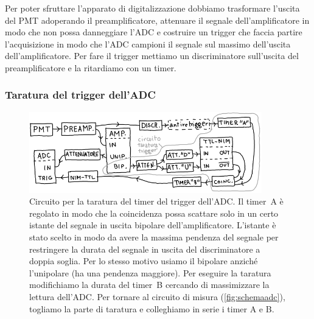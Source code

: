 Per poter sfruttare l'apparato di digitalizzazione dobbiamo trasformare l'uscita del PMT adoperando il preamplificatore,
attenuare il segnale dell'amplificatore in modo che non possa danneggiare l'ADC
e costruire un trigger che faccia partire l'acquisizione
in modo che l'ADC campioni il segnale sul massimo dell'uscita dell'amplificatore.
Per fare il trigger mettiamo un discriminatore sull'uscita del preamplificatore
e la ritardiamo con un timer.

\subsubsection{Taratura del trigger dell'ADC}

\begin{figure}
	\centering
	\includegraphics[width=0.9\textwidth]{schematrig}
	\caption{\label{fig:schematrig}
	Circuito per la taratura del timer del trigger dell'ADC.
	Il timer~A è regolato in modo che la coincidenza possa scattare
	solo in un certo istante del segnale in uscita bipolare dell'amplificatore.
	L'istante è stato scelto in modo da avere la massima pendenza del segnale
	per restringere la durata del segnale in uscita del discriminatore a doppia soglia.
	Per lo stesso motivo usiamo il bipolare anziché l'unipolare (ha una pendenza maggiore).
	Per eseguire la taratura modifichiamo la durata del timer~B
	cercando di massimizzare la lettura dell'ADC.
	Per tornare al circuito di misura (\autoref{fig:schemaadc}),
	togliamo la parte di taratura e colleghiamo in serie i timer A e B.}
\end{figure}

